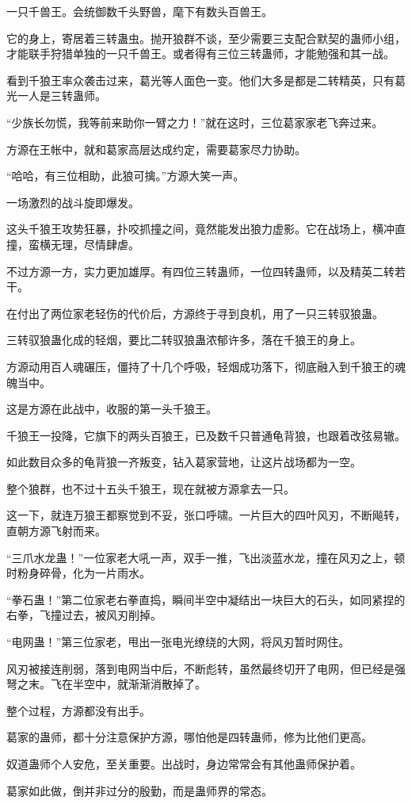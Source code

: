 \begin{this_body}
一只千兽王。会统御数千头野兽，麾下有数头百兽王。

它的身上，寄居着三转蛊虫。抛开狼群不谈，至少需要三支配合默契的蛊师小组，才能联手狩猎单独的一只千兽王。或者得有三位三转蛊师，才能勉强和其一战。

看到千狼王率众袭击过来，葛光等人面色一变。他们大多是都是二转精英，只有葛光一人是三转蛊师。

“少族长勿慌，我等前来助你一臂之力！”就在这时，三位葛家家老飞奔过来。

方源在王帐中，就和葛家高层达成约定，需要葛家尽力协助。

“哈哈，有三位相助，此狼可擒。”方源大笑一声。

一场激烈的战斗旋即爆发。

这头千狼王攻势狂暴，扑咬抓撞之间，竟然能发出狼力虚影。它在战场上，横冲直撞，蛮横无理，尽情肆虐。

不过方源一方，实力更加雄厚。有四位三转蛊师，一位四转蛊师，以及精英二转若干。

在付出了两位家老轻伤的代价后，方源终于寻到良机，用了一只三转驭狼蛊。

三转驭狼蛊化成的轻烟，要比二转驭狼蛊浓郁许多，落在千狼王的身上。

方源动用百人魂碾压，僵持了十几个呼吸，轻烟成功落下，彻底融入到千狼王的魂魄当中。

这是方源在此战中，收服的第一头千狼王。

千狼王一投降，它旗下的两头百狼王，已及数千只普通龟背狼，也跟着改弦易辙。

如此数目众多的龟背狼一齐叛变，钻入葛家营地，让这片战场都为一空。

整个狼群，也不过十五头千狼王，现在就被方源拿去一只。

这一下，就连万狼王都察觉到不妥，张口呼啸。一片巨大的四叶风刃，不断飚转，直朝方源飞射而来。

“三爪水龙蛊！”一位家老大吼一声，双手一推，飞出淡蓝水龙，撞在风刃之上，顿时粉身碎骨，化为一片雨水。

“拳石蛊！”第二位家老右拳直捣，瞬间半空中凝结出一块巨大的石头，如同紧捏的右拳，飞撞过去，被风刃削掉。

“电网蛊！”第三位家老，甩出一张电光缭绕的大网，将风刃暂时网住。

风刃被接连削弱，落到电网当中后，不断彪转，虽然最终切开了电网，但已经是强弩之末。飞在半空中，就渐渐消散掉了。

整个过程，方源都没有出手。

葛家的蛊师，都十分注意保护方源，哪怕他是四转蛊师，修为比他们更高。

奴道蛊师个人安危，至关重要。出战时，身边常常会有其他蛊师保护着。

葛家如此做，倒并非过分的殷勤，而是蛊师界的常态。

\end{this_body}

